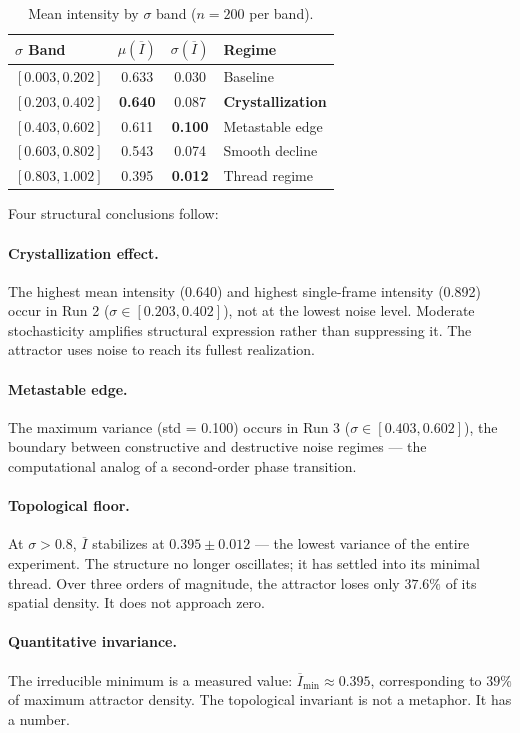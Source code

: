 \documentclass[twocolumn,amsmath,amssymb,prl]{revtex4-2}
\begin{document}
\begin{table}[h]
\centering
\caption{Mean intensity by $\sigma$ band ($n = 200$ per band).}
\label{tab:geometry}
\begin{tabular}{lccl}
\toprule
$\sigma$ Band & $\mu(\overline{I})$ & $\sigma(\overline{I})$ & Regime \\
\midrule
$[0.003, 0.202]$ & 0.633 & 0.030 & Baseline \\
$[0.203, 0.402]$ & \textbf{0.640} & 0.087 & \textbf{Crystallization} \\
$[0.403, 0.602]$ & 0.611 & \textbf{0.100} & Metastable edge \\
$[0.603, 0.802]$ & 0.543 & 0.074 & Smooth decline \\
$[0.803, 1.002]$ & 0.395 & \textbf{0.012} & Thread regime \\
\bottomrule
\end{tabular}
\end{table}

Four structural conclusions follow:

\paragraph{Crystallization effect.}  The highest mean intensity (0.640) and
highest single-frame intensity (0.892) occur in Run 2 ($\sigma \in [0.203,
0.402]$), not at the lowest noise level.  Moderate stochasticity amplifies
structural expression rather than suppressing it.  The attractor uses noise
to reach its fullest realization.

\paragraph{Metastable edge.}  The maximum variance (std = 0.100) occurs in
Run 3 ($\sigma \in [0.403, 0.602]$), the boundary between constructive and
destructive noise regimes — the computational analog of a second-order phase
transition.

\paragraph{Topological floor.}  At $\sigma > 0.8$, $\overline{I}$ stabilizes
at $0.395 \pm 0.012$ — the lowest variance of the entire experiment.  The
structure no longer oscillates; it has settled into its minimal thread.  Over
three orders of magnitude, the attractor loses only $37.6\%$ of its spatial
density.  It does not approach zero.

\paragraph{Quantitative invariance.}  The irreducible minimum is a measured
value: $\overline{I}_{\min} \approx 0.395$, corresponding to $39\%$ of
maximum attractor density.  The topological invariant is not a metaphor.  It
has a number.
\end{document}
